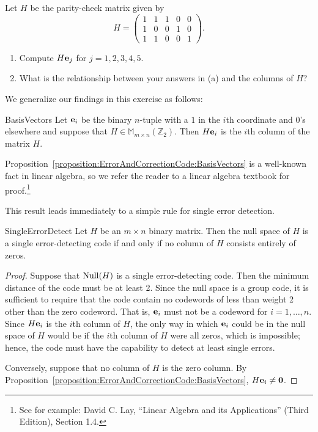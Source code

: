 \begin{exercise}{}
Let $H$ be the parity-check matrix given by
\[ H =
\left(
\begin{array}{ccccc}
1 & 1 & 1 & 0 & 0 \\
1 & 0 & 0 & 1 & 0 \\
1 & 1 & 0 & 0 & 1
\end{array}
\right).\]
\begin{enumerate}
\item 
Compute $H {\bold e}_j$ for $j = 1,2,3,4,5$.
\item
What is the relationship between your answers in (a) and the columns of $H$?
\end{enumerate}
\end{exercise}

We generalize our findings in this exercise as follows:

\begin{prop}{BasisVectors}
Let ${\bold e}_i$ be the binary $n$-tuple with a $1$ in the $i$th
coordinate and $0$'s elsewhere and suppose that $H \in \mathbb{M}_{m
\times n}(\mathbb{Z}_2)$. Then $H{\bold e}_i$ is the $i$th column of
the matrix $H$.  
\end{prop}
 Proposition~\ref{proposition:ErrorAndCorrectionCode:BasisVectors} is a well-known fact in linear algebra, so we refer the reader to a linear algebra textbook for proof.\footnote{See for example: David C. Lay, ``Linear Algebra and its Applications'' (Third Edition), Section 1.4.}
 
 This result leads immediately to a simple rule for single error detection.
 
\begin{prop}{SingleErrorDetect}
Let $H$ be an $m \times n$ binary matrix. Then the null space of $H$
is a single error-detecting code if and only if no column of $H$
consists entirely of zeros. 
\end{prop}
 
 \begin{proof}
Suppose that ${\rm Null}(H)$ is a single error-detecting code. Then the minimum
distance of the code must be at least 2. Since the null space is a
group code, it is sufficient to require that the code contain no
codewords of less than weight 2 other than the zero codeword. That
is, ${\bold e}_i$ must not be a codeword for $i = 1, \ldots, n$. Since
$H{\bold e}_i$ is the $i$th column of $H$, the only way in which
${\bold e}_i$ could be in the null space of $H$ would be if the $i$th
column of $H$ were all zeros, which is impossible; hence, the code must have
the capability to detect at least single errors.
 
 Conversely, suppose that no column of $H$ is the zero column. By 
Proposition~\ref{proposition:ErrorAndCorrectionCode:BasisVectors}, $H{\bold e}_i \neq {\bold 0}$.
\end{proof}
 
